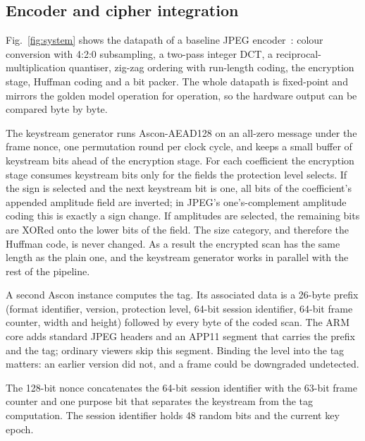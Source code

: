 \documentclass{ieeeaccess}
\begin{document}
\subsection{Encoder and cipher integration}
Fig.~\ref{fig:system} shows the datapath of a baseline JPEG encoder~\cite{t81,wallace1992}: colour conversion with 4:2:0 subsampling, a two-pass integer DCT, a reciprocal-multiplication quantiser, zig-zag ordering with run-length coding, the encryption stage, Huffman coding and a bit packer. The whole datapath is fixed-point and mirrors the golden model operation for operation, so the hardware output can be compared byte by byte.

The keystream generator runs Ascon-AEAD128 on an all-zero message under the frame nonce, one permutation round per clock cycle, and keeps a small buffer of keystream bits ahead of the encryption stage. For each coefficient the encryption stage consumes keystream bits only for the fields the protection level selects. If the sign is selected and the next keystream bit is one, all bits of the coefficient's appended amplitude field are inverted; in JPEG's one's-complement amplitude coding this is exactly a sign change. If amplitudes are selected, the remaining bits are XORed onto the lower bits of the field. The size category, and therefore the Huffman code, is never changed. As a result the encrypted scan has the same length as the plain one, and the keystream generator works in parallel with the rest of the pipeline.

A second Ascon instance computes the tag. Its associated data is a 26-byte prefix (format identifier, version, protection level, 64-bit session identifier, 64-bit frame counter, width and height) followed by every byte of the coded scan. The ARM core adds standard JPEG headers and an APP11 segment that carries the prefix and the tag; ordinary viewers skip this segment. Binding the level into the tag matters: an earlier version did not, and a frame could be downgraded undetected.

The 128-bit nonce concatenates the 64-bit session identifier with the 63-bit frame counter and one purpose bit that separates the keystream from the tag computation. The session identifier holds 48 random bits and the current key epoch.
\end{document}
